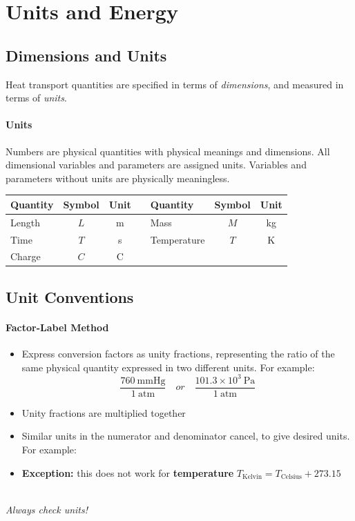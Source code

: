 \documentclass[12pt, a4paper]{article}
\begin{document}
\section{Units and Energy}
\subsection{Dimensions and Units}
Heat transport quantities are specified in terms of \textit{dimensions}, and measured in terms of \textit{units}.

\paragraph{Units} Numbers are physical quantities with physical meanings and dimensions. All dimensional variables and parameters are assigned units. Variables and parameters without units are physically meaningless.
\begin{tcolorbox}[title = 5 basic units used to describe all physical quantities]
\begin{center}
\begin{tabular}{lcc c lcc}
    \textbf{Quantity} & \textbf{Symbol} & \textbf{Unit} & & \textbf{Quantity} & \textbf{Symbol} & \textbf{Unit} \\
    \midrule
    Length & $L$ & m & & Mass & $M$ & kg \\
    Time & $T$ & s & & Temperature & $T$ & K \\
    Charge & $C$ & C & & & & \\
\end{tabular}
\end{center}
\end{tcolorbox}

\subsection{Unit Conventions}
\paragraph{Factor-Label Method}
\begin{itemize}
\item Express conversion factors as unity fractions, representing the ratio of the same physical quantity expressed in two different units. For example:
\[ 
    \frac{760 \ \mathrm{mmHg}}{1 \ \mathrm{atm}} \quad or \quad \frac{101.3 \times 10^3 \ \mathrm{Pa}}{1 \ \mathrm{atm}} 
\]
\item Unity fractions are multiplied together
\item Similar units in the numerator and denominator cancel, to give desired units. For example:
\item \textbf{Exception:} this does not work for \textbf{temperature} $T_{\mathrm{Kelvin}} = T_{\mathrm{Celsius}} + 273.15$
\end{itemize}
\ \\
\textit{Always check units!}
\end{document}
